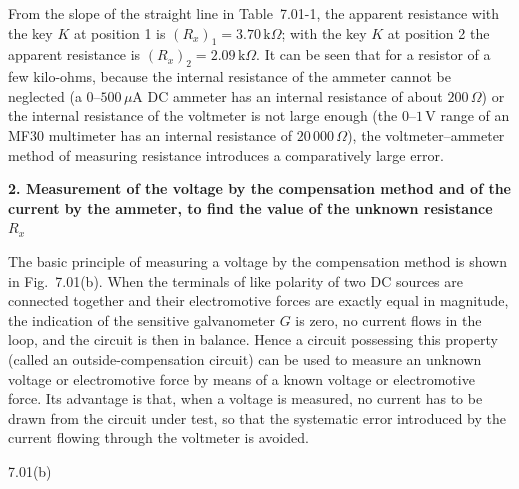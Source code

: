 From the slope of the straight line in Table~7.01-1, the apparent resistance with the key $K$ at position 1 is $(R_x)_1=3.70\,\mathrm{k}\Omega$; with the key $K$ at position 2 the apparent resistance is $(R_x)_2=2.09\,\mathrm{k}\Omega$. It can be seen that for a resistor of a few kilo-ohms, because the internal resistance of the ammeter cannot be neglected (a $0$--$500\,\mu$A DC ammeter has an internal resistance of about $200\,\Omega$) or the internal resistance of the voltmeter is not large enough (the $0$--$1$\,V range of an MF30 multimeter has an internal resistance of $20\,000\,\Omega$), the voltmeter--ammeter method of measuring resistance introduces a comparatively large error.

\textbf{2. Measurement of the voltage by the compensation method and of the current by the ammeter, to find the value of the unknown resistance $R_x$}

The basic principle of measuring a voltage by the compensation method is shown in Fig.~7.01(b). When the terminals of like polarity of two DC sources are connected together and their electromotive forces are exactly equal in magnitude, the indication of the sensitive galvanometer $G$ is zero, no current flows in the loop, and the circuit is then in balance. Hence a circuit possessing this property (called an outside-compensation circuit) can be used to measure an unknown voltage or electromotive force by means of a known voltage or electromotive force. Its advantage is that, when a voltage is measured, no current has to be drawn from the circuit under test, so that the systematic error introduced by the current flowing through the voltmeter is avoided.

\begin{figbox}{7.01(b)}
\end{figbox}

